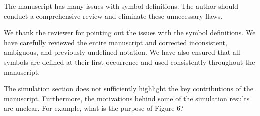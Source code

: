 \documentclass[12pt,english]{reviewresponse}
\begin{document}
% 
\begin{revcomment}[3][1]{}
	The manuscript has many issues with symbol definitions. The author should conduct a comprehensive review and eliminate these unnecessary flaws.
\end{revcomment}

\begin{revresponse}
  We thank the reviewer for pointing out the issues with the symbol definitions. 
  We have carefully reviewed the entire manuscript and corrected inconsistent, ambiguous, and previously undefined notation. 
  We have also ensured that all symbols are defined at their first occurrence and used consistently throughout the manuscript.
\end{revresponse}

% 
\begin{revcomment}[1][1]{}
	The simulation section does not sufficiently highlight the key contributions of the manuscript. Furthermore, the motivations behind some of the simulation results are unclear. For example, what is the purpose of Figure 6?
\end{revcomment}
\end{document}
